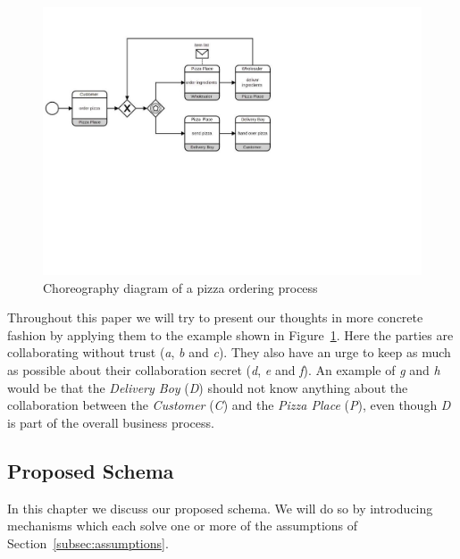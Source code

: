 \documentclass[runningheads]{llncs}
\newcommand{\ber}[1]{\textit{#1}}
\newcommand{\reffig}[1]{Figure~\ref{#1}}
\newcommand{\refsec}[1]{Section~\ref{#1}}
\newcommand{\noteme}[1]{\todo{#1}}
\begin{document}
\begin{center}
\begin{figure}
    \centering
    \includegraphics[trim=0cm 9.5cm 11.5cm 2.4cm,clip=true,scale=0.65]{newbpmn.pdf}
    \caption{Choreography diagram of a pizza ordering process} 
    \label{fig:simple_bpmn}
\end{figure}
\end{center}


Throughout this paper we will try to present our thoughts in more concrete fashion by applying them to the example shown in \reffig{fig:simple_bpmn}. Here the parties are collaborating without trust (\ber{a}, \ber{b} and \ber{c}). They also have an urge to keep as much as possible about their collaboration secret (\ber{d}, \ber{e} and \ber{f}). An example of \ber{g} and \ber{h} would be that the \textit{Delivery Boy} (\ber{D})
 should not know anything about the collaboration between the \textit{Customer} (\ber{C}) and the \textit{Pizza Place} (\ber{P}), even though \ber{D} is part of the overall business process. 



\subsection{Proposed Schema} \label{subsec:schema}

In this chapter we discuss our proposed schema. We will do so by introducing mechanisms which each solve one or more of the assumptions of \refsec{subsec:assumptions}.
\end{document}
